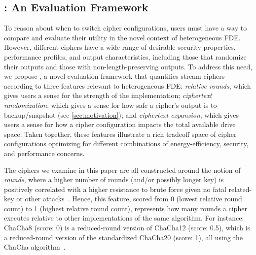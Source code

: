 \subsection{\sysC: An Evaluation Framework}\label{subsec:des-trade}

To reason about when to switch cipher configurations, users must have a way to
compare and evaluate their utility in the novel context of heterogeneous FDE.
However, different ciphers have a wide range of desirable security properties,
performance profiles, and output characteristics, including those that randomize
their outputs and those with non-length-preserving outputs. To address this
need, we propose \sysC, a novel evaluation framework that quantifies stream
ciphers according to three features relevant to heterogeneous FDE: {\em relative
rounds}, which gives users a sense for the strength of the implementation;
{\em ciphertext randomization}, which gives a sense for how safe a cipher's
output is to backup/snapshot (see \cref{sec:motivation}); and {\em ciphertext
expansion}, which gives users a sense for how a cipher configuration impacts the
total available drive space. Taken together, these features illustrate a rich
tradeoff space of cipher configurations optimizing for different combinations of
energy-efficiency, security, and performance concerns.


 The ciphers we examine in this paper are all
constructed around the notion of {\em rounds}, where a higher number of rounds
(and/or possibly longer key) is positively correlated with a higher resistance
to brute force given no fatal related-key or other
attacks~\cite{ChaCha-Cryptanalysis}. Hence, this feature, scored from 0 (lowest
relative round count) to 1 (highest relative round count), represents how many
rounds a cipher executes relative to other implementations of the same
algorithm. For instance: ChaCha8 (score: 0) is a reduced-round version of
ChaCha12 (score: 0.5), which is a reduced-round version of the standardized
ChaCha20 (score: 1), all using the ChaCha
algorithm~\cite{ChaCha20,ChaCha-Cryptanalysis}.


